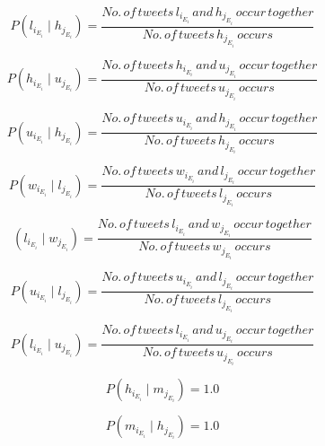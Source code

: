 \begin{equation}
P(l_{i_{E_{i}}} \mid h_{j_{E_{i}}}) = \frac{No. \, of \, tweets \, l_{i_{E_{i}}} \, and \, h_{j_{E_{i}}} \, occur \, together}{No. \, of \, tweets  \, h_{j_{E_{i}}} \, occurs}
\end{equation}

\begin{equation}
P(h_{i_{E_{i}}} \mid u_{j_{E_{i}}}) = \frac{No. \, of \, tweets  \, h_{i_{E_{i}}} \, and \, u_{j_{E_{i}}} \, occur \, together}{No. \, of \, tweets  \, u_{j_{E_{i}}} \, occurs}
\end{equation}

\begin{equation}
P(u_{i_{E_{i}}} \mid h_{j_{E_{i}}}) = \frac{No. \, of \, tweets  \, u_{i_{E_{i}}} \, and \, h_{j_{E_{i}}} \, occur \, together}{No. \, of \, tweets  \, h_{j_{E_{i}}} \, occurs}
\end{equation}

\begin{equation}
P(w_{i_{E_{i}}} \mid l_{j_{E_{i}}}) = \frac{No. \, of \, tweets  \, w_{i_{E_{i}}} \, and \, l_{j_{E_{i}}} \, occur \, together}{No. \, of \, tweets  \, l_{j_{E_{i}}} \, occurs}
\end{equation}

\begin{equation}
(l_{i_{E_{i}}} \mid w_{j_{E_{i}}}) = \frac{No. \, of \, tweets  \, l_{i_{E_{i}}} \, and \, w_{j_{E_{i}}} \, occur \, together}{No. \, of \, tweets  \, w_{j_{E_{i}}} \, occurs}
\end{equation}

\begin{equation}
P(u_{i_{E_{i}}} \mid l_{j_{E_{i}}}) = \frac{No. \, of \, tweets  \, u_{i_{E_{i}}} \, and \, l_{j_{E_{i}}} \, occur \, together}{No. \, of \, tweets  \, l_{j_{E_{i}}} \, occurs}
\end{equation}

\begin{equation}
P(l_{i_{E_{i}}} \mid u_{j_{E_{i}}}) = \frac{No. \, of \, tweets  \, l_{i_{E_{i}}} \, and \, u_{j_{E_{i}}} \, occur \, together}{No. \, of \, tweets  \, u_{j_{E_{i}}} \, occurs}
\end{equation}

\begin{equation}
P(h_{i_{E_{i}}} \mid m_{j_{E_{i}}}) = 1.0
\end{equation}

\begin{equation}
P(m_{i_{E_{i}}} \mid h_{j_{E_{i}}}) = 1.0
\end{equation}

